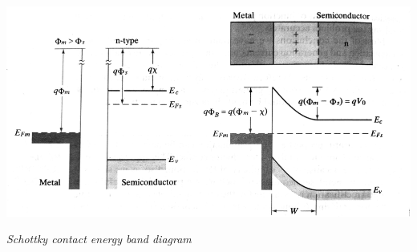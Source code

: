 \documentclass[12 pt]{article}
\begin{document}
\par
\begin{center}
    \includegraphics{Schottky_diode_n-type.png}
\end{center}
\begin{center}
    \emph{\hspace{2 cm}Schottky contact energy band diagram\newline}
\end{center}
\par
\end{document}
